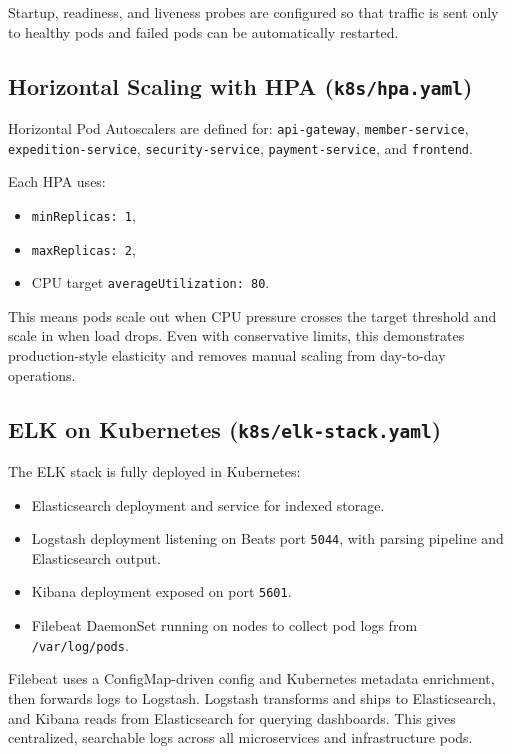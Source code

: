 \documentclass[12pt,a4paper]{article}
\begin{document}
Startup, readiness, and liveness probes are configured so that traffic is sent only to healthy pods and failed pods can be automatically restarted.

\subsection{Horizontal Scaling with HPA (\texttt{k8s/hpa.yaml})}

Horizontal Pod Autoscalers are defined for:
\texttt{api-gateway}, \texttt{member-service}, \texttt{expedition-service},
\texttt{security-service}, \texttt{payment-service}, and \texttt{frontend}.

Each HPA uses:
\begin{itemize}
    \item \texttt{minReplicas: 1},
    \item \texttt{maxReplicas: 2},
    \item CPU target \texttt{averageUtilization: 80}.
\end{itemize}

This means pods scale out when CPU pressure crosses the target threshold and scale in when load drops. Even with conservative limits, this demonstrates production-style elasticity and removes manual scaling from day-to-day operations.

\subsection{ELK on Kubernetes (\texttt{k8s/elk-stack.yaml})}

The ELK stack is fully deployed in Kubernetes:
\begin{itemize}
    \item Elasticsearch deployment and service for indexed storage.
    \item Logstash deployment listening on Beats port \texttt{5044}, with parsing pipeline and Elasticsearch output.
    \item Kibana deployment exposed on port \texttt{5601}.
    \item Filebeat DaemonSet running on nodes to collect pod logs from \texttt{/var/log/pods}.
\end{itemize}

Filebeat uses a ConfigMap-driven config and Kubernetes metadata enrichment, then forwards logs to Logstash. Logstash transforms and ships to Elasticsearch, and Kibana reads from Elasticsearch for querying dashboards. This gives centralized, searchable logs across all microservices and infrastructure pods.
\end{document}
